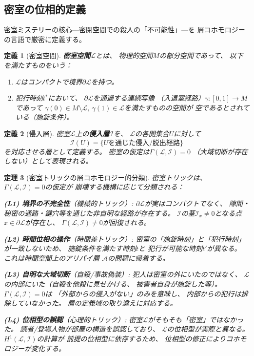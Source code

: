 \documentclass[12pt,twocolumn]{ltjsarticle}
\newtheorem{theorem}{定理}[section]
\newtheorem{definition}[theorem]{定義}
\newcommand{\Lock}{\mathcal{L}}
\begin{document}
\subsection{密室の位相的定義}

密室ミステリーの核心---密閉空間での殺人の「不可能性」---を
層コホモロジーの言語で厳密に定義する。

\begin{definition}[密室空間]
\label{def:locked_room}
\textbf{密室空間}$\Lock$とは、
物理的空間$M$の部分空間であって、
以下を満たすものをいう：
\begin{enumerate}
\item $\Lock$はコンパクトで境界$\partial \Lock$を持つ。
\item 犯行時刻$t^*$において、
$\partial \Lock$を通過する連続写像
（入退室経路）$\gamma: [0,1] \to M$であって
$\gamma(0) \in M \setminus \Lock$,
$\gamma(1) \in \Lock$を満たすものの空間が
\emph{空}であるとされている（施錠条件）。
\end{enumerate}
\end{definition}

\begin{definition}[侵入層]
\label{def:intrusion_sheaf}
密室$\Lock$上の\textbf{侵入層}$\mathcal{I}$を、
$\Lock$の各開集合$U$に対して
\begin{equation}
\mathcal{I}(U) = \{ \text{$U$を通じた侵入/脱出経路} \}
\end{equation}
を対応させる層として定義する。
密室の仮定は$\Gamma(\Lock, \mathcal{I}) = 0$
（大域切断が存在しない）として表現される。
\end{definition}

\begin{theorem}[密室トリックの層コホモロジー的分類]
\label{thm:locked_room_classification}
密室トリックは、
$\Gamma(\Lock, \mathcal{I}) = 0$の仮定が
崩壊する機構に応じて分類される：

\textbf{(L1) 境界の不完全性}（機械的トリック）:
$\partial \Lock$が実はコンパクトでなく、
隙間・秘密の通路・鍵穴等を通じた非自明な経路が存在する。
$\mathcal{I}$の茎$\mathcal{I}_x \neq 0$となる点
$x \in \partial \Lock$が存在し、
$\Gamma(\Lock, \mathcal{I}) \neq 0$が回復される。

\textbf{(L2) 時間位相の操作}（時間差トリック）:
密室の「施錠時刻」と「犯行時刻」が一致しないため、
施錠条件を満たす時刻$t$と
犯行が可能な時刻$t'$が異なる。
これは時間空間上のアリバイ層
$\mathcal{A}$の問題に帰着する。

\textbf{(L3) 自明な大域切断}（自殺/事故偽装）:
犯人は密室の外にいたのではなく、
$\Lock$の内部にいた（自殺を他殺に見せかける、
被害者自身が施錠した等）。
$\Gamma(\Lock, \mathcal{I}) = 0$は
「外部からの侵入がない」のみを意味し、
内部からの犯行は排除していなかった。
層の定義域の取り違えに対応する。

\textbf{(L4) 位相型の誤認}（心理的トリック）:
密室$\Lock$がそもそも「密室」ではなかった。
読者/登場人物が部屋の構造を誤認しており、
$\Lock$の位相型が実際と異なる。
$H^1(\Lock, \mathcal{I})$の計算が
前提の位相型に依存するため、
位相型の修正によりコホモロジーが変化する。
\end{theorem}
\end{document}
